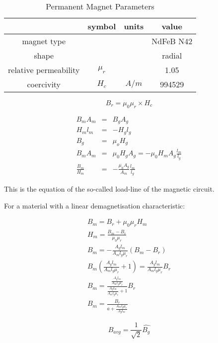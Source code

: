 \documentclass[a4paper, 11pt, titlepage]{article}
\begin{document}
\begin{table}[ht]
	\begin{center}
		\begin{tabular}{c|c|c|c}
			 & symbol & units & value \\
			\hline
			magnet type & & & NdFeB N42 \\
			shape & & & radial \\ 
			relative permeability & $\mu_r$ & & 1.05 \\
			coercivity & $H_c$ & $A/m$ & 994529 \\
			\hline
		\end{tabular}
	\end{center}
	\caption{Permanent Magnet Parameters}
	\label{fig:PMParameters}
\end{table}



\begin{equation}
	B_r = \mu_0\mu_r\times H_c 
	\label{label:remanenceFluxDensity}
\end{equation}

\begin{eqnarray}
	B_mA_m & = & B_gA_g \\
	H_ml_m & = & -H_gl_g \\
	B_g &=& \mu_oH_g \\
	B_mA_m &=& \mu_0H_gA_g=-\mu_0H_mA_g\frac{l_m}{l_g} \\
	\frac{B_m}{H_m} &=& -\frac{\mu_0A_g}{A_m}\frac{l_m}{l_g}
	\label{label:loadLine}
\end{eqnarray}

This is the equation of the so-called load-line of the magnetic circuit. 

For a material with a linear demagnetisation characteristic:

\begin{eqnarray}
	B_m = B_r + \mu_0\mu_rH_m \\
	H_m = \frac{B_m-B_r}{\mu_0\mu_r} \\
	B_m=-\frac{A_gl_m}{A_ml_g\mu_r}(B_m-B_r) \\
	B_m(\frac{A_gl_m}{A_ml_g\mu_r}+1)=\frac{A_gl_m}{A_ml_g\mu_r}B_r \\
	B_m = \frac{\frac{A_gl_m}{A_ml_g\mu_r}}{\frac{A_gl_m}{A_ml_g\mu_r}+1}B_r \\
	B_m = \frac{B_r}{a+\frac{A_ml_g\mu_r}{A_gl_m}}
	\label{label:demagnetizationCharacteristics}
\end{eqnarray}

\begin{equation}
	B_{avg} = \frac{1}{\sqrt{2}}\hat{B_g}
\end{equation}
\end{document}
